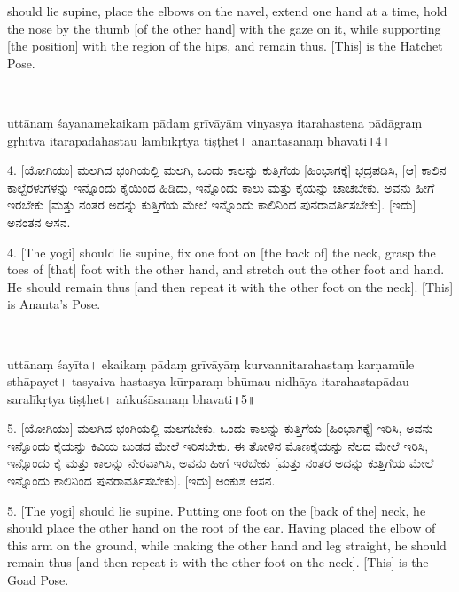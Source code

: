 \begin{eng}
 should lie supine, place the elbows on the navel, extend one hand at a time, hold the nose by the thumb [of the other hand] with the gaze on it, while supporting [the position] with the region of the hips, and remain thus. [This] is the Hatchet Pose.
\end{eng}

\newpage

~\vskip 1cm

\dummyimage
\begin{sans}
uttānaṃ śayanamekaikaṃ pādaṃ grīvāyāṃ vinyasya itarahastena pādāgraṃ gṛhītvā itarapādahastau lambīkṛtya tiṣṭhet। anantāsanaṃ bhavati॥4॥
\end{sans}
\bigskip

\begin{kan}
4. [ಯೋಗಿಯು] ಮಲಗಿದ ಭಂಗಿಯಲ್ಲಿ ಮಲಗಿ, ಒಂದು ಕಾಲನ್ನು ಕುತ್ತಿಗೆಯ [ಹಿಂಭಾಗಕ್ಕೆ] ಭದ್ರಪಡಿಸಿ, [ಆ] ಕಾಲಿನ ಕಾಲ್ಬೆರಳುಗಳನ್ನು ಇನ್ನೊಂದು ಕೈಯಿಂದ ಹಿಡಿದು, ಇನ್ನೊಂದು ಕಾಲು ಮತ್ತು ಕೈಯನ್ನು ಚಾಚಬೇಕು. ಅವನು ಹೀಗೆ ಇರಬೇಕು [ಮತ್ತು ನಂತರ ಅದನ್ನು ಕುತ್ತಿಗೆಯ ಮೇಲೆ ಇನ್ನೊಂದು ಕಾಲಿನಿಂದ ಪುನರಾವರ್ತಿಸಬೇಕು]. [ಇದು] ಅನಂತನ ಆಸನ.
\end{kan}
\bigskip

\begin{eng}
4. [The yogi] should lie supine, fix one foot on [the back of] the neck, grasp the toes of [that] foot with the other hand, and stretch out the other foot and hand. He should remain thus [and then repeat it with the other foot on the neck]. [This] is Ananta’s Pose.
\end{eng}


\newpage

~\vskip 1cm

\dummyimage
\begin{sans}
uttānaṃ śayīta\endnote{śayīta~] \textit{emend.}, śayātaṃ M.}। ekaikaṃ pādaṃ grīvāyāṃ kurvannitarahastaṃ karṇamūle sthāpayet। tasyaiva hastasya kūrparaṃ bhūmau nidhāya itarahastapādau  saralīkṛtya tiṣṭhet। aṅkuśāsanaṃ bhavati॥5॥
\end{sans}
\bigskip

\begin{kan}
5. [ಯೋಗಿಯು] ಮಲಗಿದ ಭಂಗಿಯಲ್ಲಿ ಮಲಗಬೇಕು. ಒಂದು ಕಾಲನ್ನು ಕುತ್ತಿಗೆಯ [ಹಿಂಭಾಗಕ್ಕೆ] ಇರಿಸಿ, ಅವನು ಇನ್ನೊಂದು ಕೈಯನ್ನು ಕಿವಿಯ ಬುಡದ ಮೇಲೆ ಇರಿಸಬೇಕು. ಈ ತೋಳಿನ ಮೊಣಕೈಯನ್ನು ನೆಲದ ಮೇಲೆ ಇರಿಸಿ, ಇನ್ನೊಂದು ಕೈ ಮತ್ತು ಕಾಲನ್ನು ನೇರವಾಗಿಸಿ, ಅವನು ಹೀಗೆ ಇರಬೇಕು [ಮತ್ತು ನಂತರ ಅದನ್ನು ಕುತ್ತಿಗೆಯ ಮೇಲೆ ಇನ್ನೊಂದು ಕಾಲಿನಿಂದ ಪುನರಾವರ್ತಿಸಬೇಕು]. [ಇದು] ಅಂಕುಶ ಆಸನ.
\end{kan}
\bigskip

\begin{eng}
5. [The yogi] should lie supine. Putting one foot on the [back of the] neck, he should place the other hand on the root of the ear. Having placed the elbow of this arm on the ground, while making the other hand and leg straight, he should remain thus [and then repeat it with the other foot on the neck]. [This] is the Goad Pose.
\end{eng}

